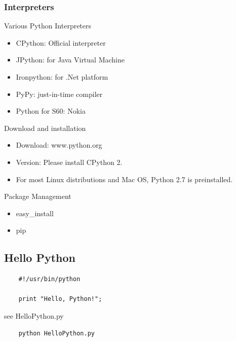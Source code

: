 \documentclass[UTF8]{beamer}
\begin{document}
\begin{frame}
  \frametitle{Interpreters}
  \begin{block}{Various Python Interpreters}
    \begin{itemize}
      \item CPython: Official interpreter
      \item JPython: for Java Virtual Machine
      \item Ironpython: for .Net platform
      \item PyPy: just-in-time compiler
      \item Python for S60: Nokia
    \end{itemize}
  \end{block}
\end{frame}

\begin{frame}[t]{Download and installation}
  \begin{itemize}
    \item Download: www.python.org
    \item Version: Please install CPython 2.
    \item For most Linux distributions and Mac OS, Python 2.7 is preinstalled.
  \end{itemize}
\end{frame}

\begin{frame}[t]{Package Management}
  \begin{itemize}
    \item easy_install
    \item pip
  \end{itemize}
\end{frame}

\subsection{Hello Python}
\begin{frame}[fragile]
  \begin{verbatim}
    #!/usr/bin/python

    print "Hello, Python!";
  \end{verbatim}
  see HelloPython.py
\end{frame}

\begin{frame}[fragile]
  \begin{verbatim}
    python HelloPython.py
  \end{verbatim}
\end{frame}
\end{document}
